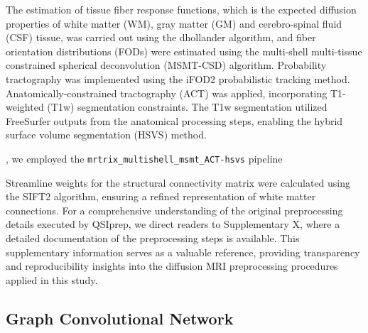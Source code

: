 \documentclass{cys}
\begin{document}
The estimation of tissue fiber response functions, which is the expected diffusion properties of white matter (WM), gray matter (GM) and cerebro-spinal fluid (CSF) tissue, was carried out using the dhollander algorithm, and fiber orientation distributions (FODs) were estimated using the multi-shell multi-tissue constrained spherical deconvolution (MSMT-CSD) algorithm. Probability tractography was implemented using the iFOD2 probabilistic tracking method. Anatomically-constrained tractography (ACT) was applied, incorporating T1-weighted (T1w) segmentation constraints. The T1w segmentation utilized FreeSurfer outputs from the anatomical processing steps, enabling the hybrid surface volume segmentation (HSVS) method.

, we employed the \texttt{mrtrix\_multishell\_msmt\_ACT-hsvs} pipeline

\bigskip
Streamline weights for the structural connectivity matrix were calculated using the SIFT2 algorithm, ensuring a refined representation of white matter connections. For a comprehensive understanding of the original preprocessing details executed by QSIprep, we direct readers to Supplementary X, where a detailed documentation of the preprocessing steps is available. This supplementary information serves as a valuable reference, providing transparency and reproducibility insights into the diffusion MRI preprocessing procedures applied in this study.






\subsection{Graph Convolutional Network}
\label{subsection:GCN}


\end{document}
